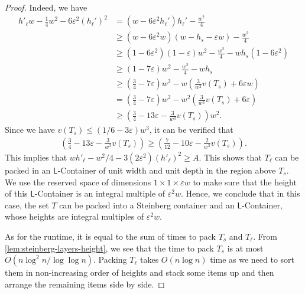 \documentclass[10pt,a4paper]{amsart}
\newcommand{\kvnr}[1]{}
\newcommand{\eps}{\varepsilon}
\theoremstyle{definition}
\newcommand{\LContainer}{$\mathsf{L}$-Container}
\begin{document}
\begin{proof}
Indeed, we have
\begin{align*}
    h'_{\ell}w-\frac14w^2-6\eps^2(h_{\ell}')^2 &= (w-6\eps^2h_{\ell}')h_{\ell}'-\frac{w^2}{4}\\
    &\ge (w-6\eps^2w)(w-h_s-\eps w)-\frac{w^2}{4}\\
    &\ge (1-6\eps^2)(1-\eps)w^2-\frac{w^2}{4}-w h_s(1-6\eps^2)\\
    &\ge (1-7\eps)w^2-\frac{w^2}{4}-wh_s\\
    &\ge \left(\frac34-7\eps\right)w^2-w\left(\frac{3}{w^2}v(T_s)+6\eps w\right)\\
    &= \left(\frac34-7\eps\right)w^2-w^2\left(\frac{3}{w^3}v(T_s)+6\eps\right)\\
    &\ge \left(\frac34-13\eps-\frac{3}{w^3}v(T_s)\right)w^2.
\end{align*}
Since we have $v(T_s)\le (1/6-3\eps)w^3$, it can be verified that 
\begin{align*}
\left(\frac34-13\eps-\frac{3}{w^3}v(T_s)\right)\ge \left(\frac{7}{12}-10\eps-\frac{2}{w^3}v(T_s)\right).
\end{align*}
This implies that $wh'_{\ell}-w^2/4-3(2\eps^2)(h'_{\ell})^2\ge A$.
This shows that $T_\ell$ can be packed in an \LContainer{} of unit width and unit depth in the region above $T_s$. We use the reserved space of dimensions $1\times1\times\eps w$
to make sure that the height of this \LContainer{} is an integral multiple of $\eps^2 w$. Hence, we conclude that in this case, the set $T$ can be packed into a Steinberg container
and an \LContainer{}, whose heights are integral multiples of $\eps^2 w$.

As for the runtime, it is equal to the sum of times to pack $T_s$ and $T_\ell$. From \cref{lem:steinberg-layers-height}, we see that the time to pack $T_s$ is at most
$O(n\log^2 n/\log \log n)$. Packing $T_\ell$ takes $O(n\log n)$ time as we need to sort them in non-increasing order of heights and stack some items up and then arrange the remaining items side by side.
\end{proof}
\end{document}
